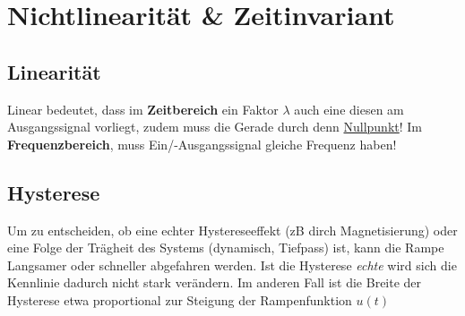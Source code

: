 \section{Nichtlinearität \& Zeitinvariant}
\subsection{Linearität}
Linear bedeutet, dass im \textbf{Zeitbereich} ein Faktor $\lambda$ auch eine diesen am Ausgangssignal vorliegt, zudem muss die Gerade durch denn \underline{Nullpunkt}! Im \textbf{Frequenzbereich}, muss Ein/-Ausgangssignal gleiche Frequenz haben!

\subsection{Hysterese}
Um zu entscheiden, ob eine echter Hystereseeffekt (zB dirch Magnetisierung) oder eine Folge der Trägheit des Systems (dynamisch, Tiefpass) ist, kann die Rampe Langsamer oder schneller abgefahren werden. Ist die Hysterese \textit{echte} wird sich die Kennlinie dadurch nicht stark verändern. Im anderen Fall ist die Breite der Hysterese etwa proportional zur Steigung der Rampenfunktion $u(t)$

